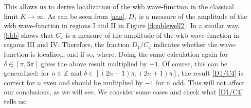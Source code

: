 \documentclass[12pt]{article}
\begin{document}
\noindent This allows us to derive localization of the {\sc wkb} wave-function in the classical limit $K\rightarrow\infty$.
As can be seen from \eqref{aaa}, $D_1$ is a measure of the amplitude of the {\sc wkb} wave-function in regions I and II in Figure \ref{doublewell2}.
In a similar way, \eqref{bbb} shows that $C_4$ is a measure of the amplitude  of the {\sc wkb} wave-function in regions III and IV.
Therefore, the fraction $D_1/C_4$  indicates whether  the wave-function is localized, and if so, where.
Doing the same calculation again for $\delta\in[\pi,3\pi]$ gives the above result multiplied by $-1$.
Of course, this can be generalized: for $n\in\mathbb{Z}$ and $\delta\in[(2n-1)\pi,(2n+1)\pi]$, the result \eqref{D1/C4} is correct for $n$ even and should be multiplied by $-1$ for $n$ odd. 
This will not affect our conclusions, as we will see.
We consider some cases and check what \eqref{D1/C4} tells us:
\end{document}
